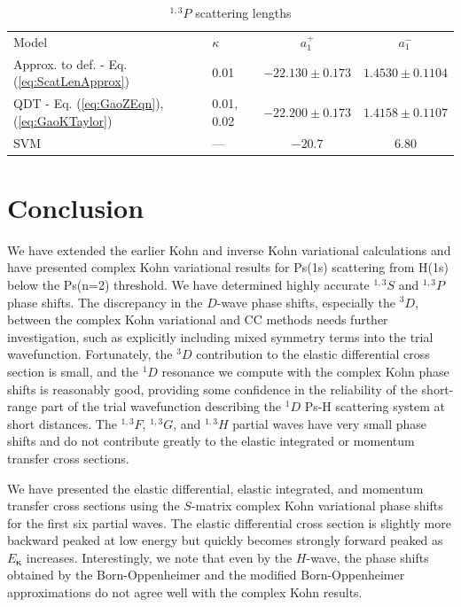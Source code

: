 \documentclass[preprint,showpacs,showkeys,preprintnumbers,amsmath,amssymb,longbibliography,pra,aps]{revtex4-1}
\begin{document}
{\begin{table}[H]
\begin{center}
\begin{ruledtabular}
\begin{tabular}{l l c c}
Model & $\kappa$ & $a_1^+$ & $a_1^-$ \\
\colrule
Approx. to def. - Eq. (\ref{eq:ScatLenApprox}) & 0.01 & $-22.130 \pm 0.173$ & $1.4530 \pm 0.1104$ \\
QDT - Eq. (\ref{eq:GaoZEqn}), (\ref{eq:GaoKTaylor}) & 0.01, 0.02 & $-22.200 \pm 0.173$ & $1.4158 \pm 0.1107$ \\
\colrule
SVM \cite{Ivanov2002} & --- & $-20.7$ & $6.80$ 
\end{tabular}
\end{ruledtabular}
\caption{$^{1,3}P$ scattering lengths}
\label{tab:PWaveScatLen}
\end{center}
\end{table}


\section{Conclusion}
We have extended the earlier Kohn 
and inverse Kohn variational calculations \cite{VanReeth2003,VanReeth2004}
and have presented complex Kohn variational results for Ps(1s) scattering from H(1s)
below the Ps(n=2) threshold.
We have determined highly accurate $^{1,3}S$ and $^{1,3}P$ phase shifts.
The discrepancy in the $D$-wave phase shifts, especially the $^3D$, between the 
complex Kohn variational and CC methods needs further investigation, such as 
explicitly including mixed symmetry terms into the trial wavefunction.
Fortunately, the $^3D$ contribution to the elastic differential 
cross section is small, and the $^1D$ resonance we compute with the complex Kohn 
phase shifts is reasonably good, providing some confidence in the reliability 
of the short-range part of the trial wavefunction describing the $^1D$ Ps-H 
scattering system at short distances. The $^{1,3}F$, $^{1,3}G$, and $^{1,3}H$ partial
waves have very small phase shifts and do not contribute greatly to the
elastic integrated or momentum transfer cross sections.

We have presented the elastic differential, elastic integrated, and momentum 
transfer cross sections using the $S$-matrix 
complex Kohn variational phase shifts for the first six partial waves.
The elastic differential cross section is slightly more backward peaked at
low energy but quickly becomes strongly forward peaked as $E_{\bm \kappa}$
increases.
Interestingly, we note that even by the $H$-wave, the phase shifts obtained 
by the Born-Oppenheimer and the modified Born-Oppenheimer approximations do not agree well with the 
complex Kohn results.

}
\end{document}
